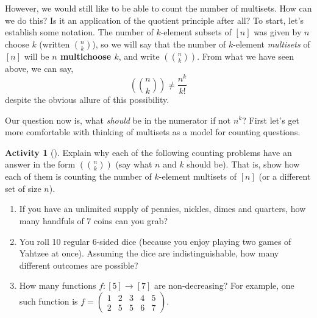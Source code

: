 \documentclass[10pt,]{book}
\newcommand{\terminology}[1]{\textbf{#1}}
\theoremstyle{plain}
\theoremstyle{definition}
\theoremstyle{definition}
\theoremstyle{definition}
\newtheorem{activity}[project]{Activity}
\numberwithin{equation}{chapter}
\newcommand{\mchoose}[2]{\left(\!\binom{#1}{#2}\!\right)}
\newcommand{\twoline}[2]{\begin{pmatrix}#1 \\ #2 \end{pmatrix}}
\newcommand{\amp}{&}
\begin{document}
\par
\hypertarget{p-811}{}%
However, we would still like to be able to count the number of multisets.  How can we do this?  Is it an application of the quotient principle after all?  To start, let's establish some notation.  The number of \(k\)-element subsets of \([n]\) was given by \(n\) choose \(k\) (written \(\binom{n}{k}\)), so we will say that the number of \(k\)-element \emph{multisets} of \([n]\) will be \terminology{\(n\) multichoose \(k\)}, and write \(\mchoose{n}{k}\).  From what we have seen above, we can say,%
\begin{equation*}
\mchoose{n}{k} \ne \frac{n^k}{k!}
\end{equation*}
despite the obvious allure of this possibility.%
\par
\hypertarget{p-812}{}%
Our question now is, what \emph{should} be in the numerator if not \(n^k\)?  First let's get more comfortable with thinking of multisets as a model for counting questions.%
\begin{activity}[]\label{activity-113}
\hypertarget{p-813}{}%
Explain why each of the following counting problems have an answer in the form \(\mchoose{n}{k}\) (say what \(n\) and \(k\) should be).  That is, show how each of them is counting the number of \(k\)-element multisets of \([n]\) (or a different set of size \(n\)).%
\begin{enumerate}[font=\bfseries,label=(\alph*),ref=\alph*]
\item\label{task-155} \hypertarget{p-814}{}%
If you have an unlimited supply of pennies, nickles, dimes and quarters, how many handfuls of 7 coins can you grab?%
\item\label{task-156} \hypertarget{p-815}{}%
You roll 10 regular 6-sided dice (because you enjoy playing two games of Yahtzee at once).  Assuming the dice are indistinguishable, how many different outcomes are possible?%
\item\label{task-157} \hypertarget{p-816}{}%
How many functions \(f:[5] \to [7]\) are non-decreasing?  For example, one such function is \(f = \twoline{1 \amp 2 \amp 3 \amp 4 \amp 5}{2 \amp 5 \amp 5 \amp 6 \amp 7}\).%
\end{enumerate}
\end{activity}
\end{document}
